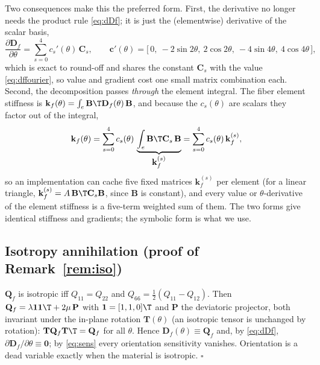 Two consequences make this the preferred form. First, the derivative no longer needs
the product rule \eqref{eq:dDf}; it is just the (elementwise) derivative of the
scalar basis,
\begin{equation}
  \frac{\partial\mathbf D_f}{\partial\theta}=\sum_{s=0}^{4}c_s'(\theta)\,\mathbf C_s,
  \qquad
  \mathbf c'(\theta)=\bigl[\,0,\ -2\sin2\theta,\ 2\cos2\theta,\ -4\sin4\theta,\ 4\cos4\theta\,\bigr],
  \label{eq:dffourierderiv}
\end{equation}
which is exact to round-off and shares the constant $\mathbf C_s$ with the value
\eqref{eq:dffourier}, so value and gradient cost one small matrix combination each.
Second, the decomposition passes \emph{through} the element integral. The fiber
element stiffness is $\mathbf k_f(\theta)=\int_e \mathbf B\T\mathbf D_f(\theta)\,
\mathbf B$, and because the $c_s(\theta)$ are scalars they factor out of the integral,
\begin{equation}
  \mathbf k_f(\theta)=\sum_{s=0}^{4}c_s(\theta)\,\underbrace{\int_e \mathbf B\T
    \mathbf C_s\,\mathbf B}_{\textstyle \mathbf k_f^{(s)}}
  =\sum_{s=0}^{4}c_s(\theta)\,\mathbf k_f^{(s)} ,
  \label{eq:kffourier}
\end{equation}
so an implementation can cache five fixed matrices $\mathbf k_f^{(s)}$ per element (for
a linear triangle, $\mathbf k_f^{(s)}=A\,\mathbf B\T\mathbf C_s\mathbf B$, since
$\mathbf B$ is constant), and every value or $\theta$-derivative of the element stiffness
is a five-term weighted sum of them. The two forms give identical stiffness and gradients;
the symbolic form is what we use.

\subsection{Isotropy annihilation (proof of Remark~\ref{rem:iso})}
$\mathbf Q_f$ is isotropic iff $Q_{11}=Q_{22}$ and $Q_{66}=\tfrac12(Q_{11}-Q_{12})$.
Then $\mathbf Q_f=\lambda\mathbf 1\mathbf 1\T+2\mu\,\mathbf P$ with $\mathbf
1=[1,1,0]\T$ and $\mathbf P$ the deviatoric projector, both invariant under the
in-plane rotation $\mathbf T(\theta)$ (an isotropic tensor is unchanged by
rotation): $\mathbf T\mathbf Q_f\mathbf T\T=\mathbf Q_f$ for all $\theta$. Hence
$\mathbf D_f(\theta)\equiv\mathbf Q_f$ and, by \eqref{eq:dDf},
$\partial\mathbf D_f/\partial\theta\equiv\mathbf 0$; by \eqref{eq:sens} every
orientation sensitivity vanishes. Orientation is a dead variable exactly when the
material is isotropic. $\square$

